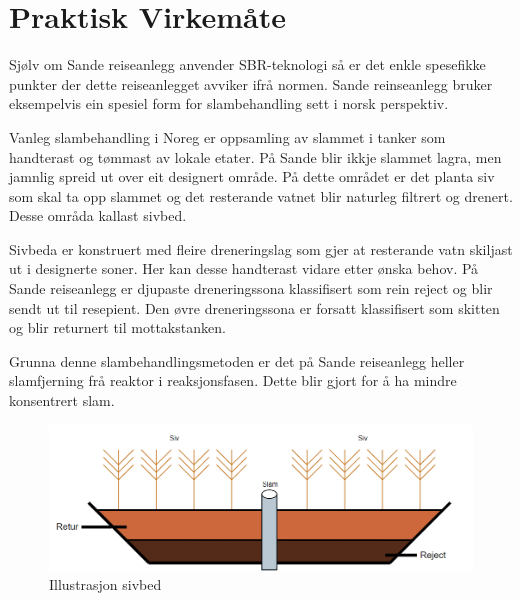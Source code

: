 \newpage
\section{Praktisk Virkemåte}
\thispagestyle{fancy}

Sjølv om Sande reiseanlegg anvender SBR-teknologi så er det enkle spesefikke
punkter der dette reiseanlegget avviker ifrå normen. 
Sande reinseanlegg bruker eksempelvis ein spesiel form for slambehandling sett i norsk perspektiv.

Vanleg slambehandling i Noreg er oppsamling av slammet i tanker som handterast og tømmast av lokale etater.
På Sande blir ikkje slammet lagra, men jamnlig spreid ut over eit designert område. På dette området er
det planta siv som skal ta opp slammet og det resterande vatnet blir naturleg filtrert og drenert.
Desse områda kallast sivbed.

Sivbeda er konstruert med fleire dreneringslag som gjer at resterande vatn skiljast ut i designerte soner.
Her kan desse handterast vidare etter ønska behov. 
På Sande reiseanlegg er djupaste dreneringssona klassifisert som rein reject og blir sendt ut til resepient.
Den øvre dreneringssona er forsatt klassifisert som skitten og blir returnert til mottakstanken.

Grunna denne slambehandlingsmetoden er det på Sande reiseanlegg heller slamfjerning frå reaktor
i reaksjonsfasen. Dette blir gjort for å ha mindre konsentrert slam.

\begin{figure}[htbp]
    \centering
    \includegraphics[width=1\textwidth]{Figurar/Sivbed.png}
    \caption{Illustrasjon sivbed}\label{fig:HMI}
\end{figure}

